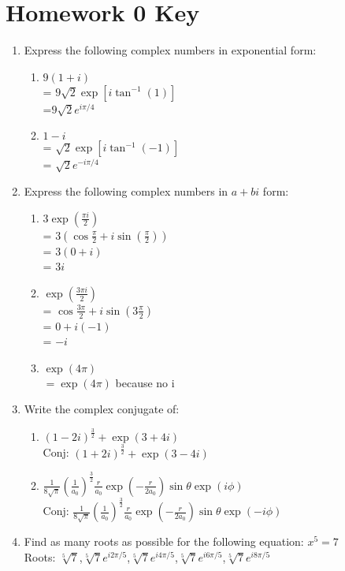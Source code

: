 \documentclass{article}
\begin{document}
\section*{Homework 0 Key}

\begin{enumerate}%

\item Express the following complex numbers in exponential form:

\begin{enumerate}
    \item $9(1+i)$
    \\= $9\sqrt{2}\exp{\left[i\tan^{-1}(1)\right]}$
    \\=$9\sqrt{2}e^{i\pi/4}$
    
    \item $1-i$
    \\= $\sqrt{2}\exp{\left[i\tan^{-1}(-1)\right]}$
    \\= $\sqrt{2}e^{-i\pi/4}$
    
    \end{enumerate}
    
\item Express the following complex numbers in $a+bi$ form:
    \begin{enumerate}
    \item $3\exp{\left(\frac{\pi i}{2}\right)}$
    \\ = $3\left(\cos\frac{\pi}{2}+i\sin(\frac{\pi}{2})\right)$
    \\ = $3(0+i)$
    \\ = $3i$
    
    \item $\exp{\left(\frac{3\pi i}{2}\right)}$
    \\ = $\cos\frac{3\pi}{2}+i\sin(3\frac{\pi}{2})$
    \\ = $0+i(-1)$
    \\ = $-i$
    
    \item $\exp(4\pi)$
    \\ $=\exp(4\pi)$ because no i 
    \end{enumerate}

\item Write the complex conjugate of:
    \begin{enumerate}
    \item $(1-2i)^\frac{3}{2}+\exp(3+4i)$
    \\ Conj: $(1+2i)^\frac{3}{2}+\exp(3-4i)$
    \item $\frac{1}{8\sqrt{\pi}}\left(\frac{1}{a_0}\right)^{\frac{3}{2}}\frac{r}{a_0}\exp\left(-\frac{r}{2a_0}\right)\sin{\theta}\exp(i\phi)$
    \\Conj: $\frac{1}{8\sqrt{\pi}}\left(\frac{1}{a_0}\right)^{\frac{3}{2}}\frac{r}{a_0}\exp\left(-\frac{r}{2a_0}\right)\sin{\theta}\exp(-i\phi)$
    \end{enumerate}
\item Find as many roots as possible for the following equation: $x^5=7$
\\
Roots:  $\sqrt[5]{7}$,$\sqrt[5]{7}e^{i2\pi/5}$,$\sqrt[5]{7}e^{i4\pi/5}$,$\sqrt[5]{7}e^{i6\pi/5}$,$\sqrt[5]{7}e^{i8\pi/5}$


\end{enumerate}
\end{document}
